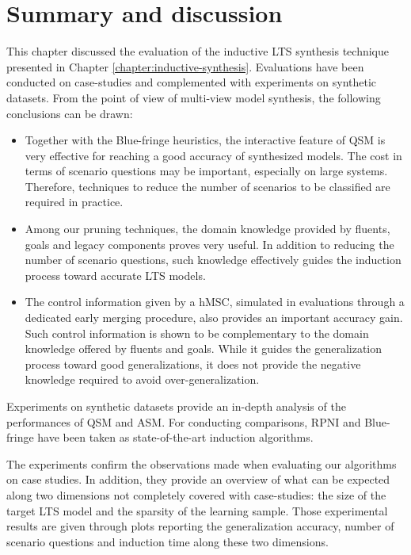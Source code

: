 \section{Summary and discussion\label{section:evaluation-summary}}

This chapter discussed the evaluation of the inductive LTS synthesis technique presented in Chapter \ref{chapter:inductive-synthesis}. Evaluations have been conducted on case-studies and complemented with experiments on synthetic datasets. From the point of view of multi-view model synthesis, the following conclusions can be drawn:
\begin{itemize}
\item Together with the Blue-fringe heuristics, the interactive feature of QSM is very effective for reaching a good accuracy of synthesized models. The cost in terms of scenario questions may be important, especially on large systems. Therefore, techniques to reduce the number of scenarios to be classified are required in practice.
\item Among our pruning techniques, the domain knowledge provided by fluents, goals and legacy components proves very useful. In addition to reducing the number of scenario questions, such knowledge effectively guides the induction process toward accurate LTS models. 
\item The control information given by a hMSC, simulated in evaluations through a dedicated early merging procedure, also provides an important accuracy gain. Such control information is shown to be complementary to the domain knowledge offered by fluents and goals. While it guides the generalization process toward good generalizations, it does not provide the negative knowledge required to avoid over-generalization.
\end{itemize}

Experiments on synthetic datasets provide an in-depth analysis of the performances of QSM and ASM. For conducting comparisons, RPNI and Blue-fringe have been taken as state-of-the-art induction algorithms. 

The experiments confirm the observations made when evaluating our algorithms on case studies. In addition, they provide an overview of what can be expected along two dimensions not completely covered with case-studies: the size of the target LTS model and the sparsity of the learning sample. Those experimental results are given through plots reporting the generalization accuracy, number of scenario questions and induction time along these two dimensions.

